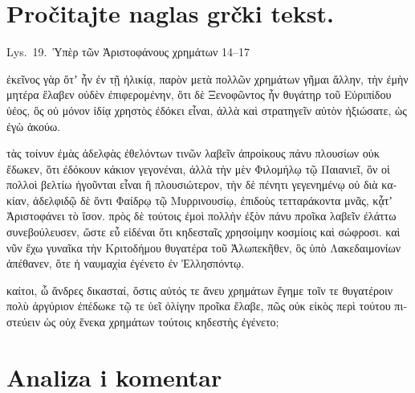 
\section*{Pročitajte naglas grčki tekst.}

Lys.\ 19.\ Ὑπὲρ τῶν Ἀριστοφάνους χρημάτων 14–17


\medskip


{\large

\begin{greek}

\noindent  ἐκεῖνος γὰρ ὅτʼ ἦν ἐν τῇ ἡλικίᾳ, παρὸν μετὰ πολλῶν χρημάτων γῆμαι ἄλλην, τὴν ἐμὴν μητέρα ἔλαβεν οὐδὲν ἐπιφερομένην, ὅτι δὲ Ξενοφῶντος ἦν θυγάτηρ τοῦ Εὐριπίδου ὑέος, ὃς οὐ μόνον ἰδίᾳ χρηστὸς ἐδόκει εἶναι, ἀλλὰ καὶ στρατηγεῖν αὐτὸν ἠξιώσατε, ὡς ἐγὼ ἀκούω.

τὰς τοίνυν ἐμὰς ἀδελφὰς ἐθελόντων τινῶν λαβεῖν ἀπροίκους πάνυ πλουσίων οὐκ ἔδωκεν, ὅτι ἐδόκουν κάκιον γεγονέναι, ἀλλὰ τὴν μὲν Φιλομήλῳ τῷ Παιανιεῖ, ὃν οἱ πολλοὶ βελτίω ἡγοῦνται εἶναι ἢ πλουσιώτερον, τὴν δὲ πένητι γεγενημένῳ οὐ διὰ κακίαν, ἀδελφιδῷ δὲ ὄντι Φαίδρῳ τῷ Μυρρινουσίῳ, ἐπιδοὺς τετταράκοντα μνᾶς, κᾆτʼ Ἀριστοφάνει τὸ ἴσον. πρὸς δὲ τούτοις ἐμοὶ πολλὴν ἐξὸν πάνυ προῖκα λαβεῖν ἐλάττω συνεβούλευσεν, ὥστε εὖ εἰδέναι ὅτι κηδεσταῖς χρησοίμην κοσμίοις καὶ σώφροσι. καὶ νῦν ἔχω γυναῖκα τὴν Κριτοδήμου θυγατέρα τοῦ Ἀλωπεκῆθεν, ὃς ὑπὸ Λακεδαιμονίων ἀπέθανεν, ὅτε ἡ ναυμαχία ἐγένετο ἐν Ἑλλησπόντῳ.

καίτοι, ὦ ἄνδρες δικασταί, ὅστις αὐτός τε ἄνευ χρημάτων ἔγημε τοῖν τε θυγατέροιν πολὺ ἀργύριον ἐπέδωκε τῷ τε ὑεῖ ὀλίγην προῖκα ἔλαβε, πῶς οὐκ εἰκὸς περὶ τούτου πιστεύειν ὡς οὐχ ἕνεκα χρημάτων τούτοις κηδεστὴς ἐγένετο;


\end{greek}

}


\section*{Analiza i komentar}


